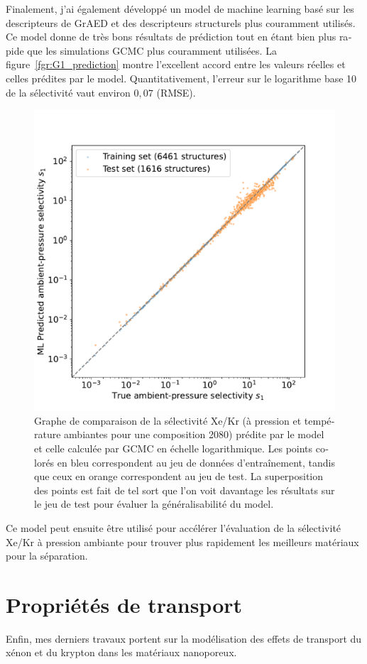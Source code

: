 \documentclass[thesis]{subfiles}
\begin{document}
\begin{otherlanguage}{french}
Finalement, j'ai également développé un model de machine learning basé sur les descripteurs de GrAED et des descripteurs structurels plus couramment utilisés. Ce model donne de très bons résultats de prédiction tout en étant bien plus rapide que les simulations GCMC plus couramment utilisées. La figure~\ref{fgr:G1_prediction} montre l'excellent accord entre les valeurs réelles et celles prédites par le model. Quantitativement, l'erreur sur le logarithme base 10 de la sélectivité vaut environ $0,07$ (RMSE).
\begin{figure}[ht]
\centering
    \includegraphics[width=0.48\linewidth]{figures/4-ml/SI_figure/Scatterplot_S1_prediction_logscale.pdf}
    \caption{Graphe de comparaison de la sélectivité Xe/Kr (à pression et température ambiantes pour une composition 20\pp{}80) prédite par le model et celle calculée par GCMC en échelle logarithmique. Les points colorés en bleu correspondent au jeu de données d'entraînement, tandis que ceux en orange correspondent au jeu de test. La superposition des points est fait de tel sort que l'on voit davantage les résultats sur le jeu de test pour évaluer la généralisabilité du model.}\label{fgr:S1_prediction}
\end{figure}

Ce model peut ensuite être utilisé pour accélérer l'évaluation de la sélectivité Xe/Kr à pression ambiante pour trouver plus rapidement les meilleurs matériaux pour la séparation.

\section*{Propriétés de transport}

Enfin, mes derniers travaux portent sur la modélisation des effets de transport du xénon et du krypton dans les matériaux nanoporeux. 


\end{otherlanguage}
\end{document}
